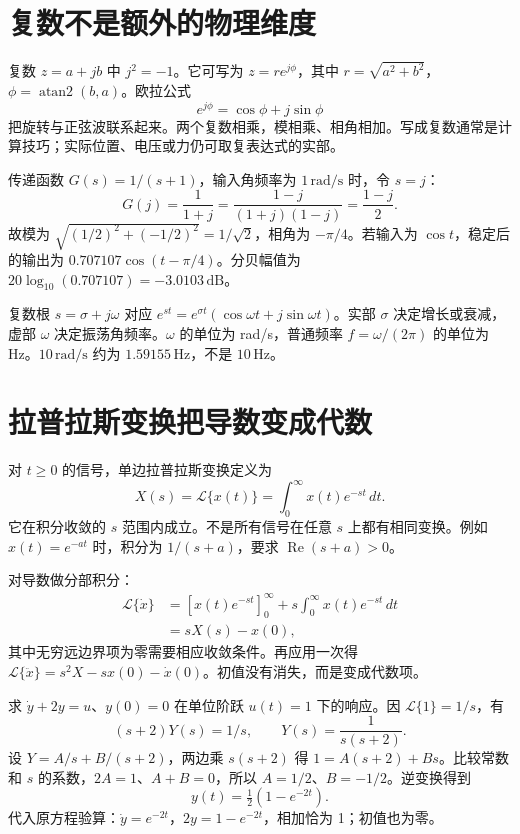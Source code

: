\section{复数不是额外的物理维度}
复数 $z=a+jb$ 中 $j^2=-1$。它可写为 $z=re^{j\phi}$，其中 $r=\sqrt{a^2+b^2}$，$\phi=\operatorname{atan2}(b,a)$。欧拉公式
\begin{equation}
 e^{j\phi}=\cos\phi+j\sin\phi
\end{equation}
把旋转与正弦波联系起来。两个复数相乘，模相乘、相角相加。写成复数通常是计算技巧；实际位置、电压或力仍可取复表达式的实部。

\begin{examplebox}[算例 一阶低通的幅值衰减和相位]
传递函数 $G(s)=1/(s+1)$，输入角频率为 $1\,\mathrm{rad/s}$ 时，令 $s=j$：
\[
 G(j)=\frac1{1+j}=\frac{1-j}{(1+j)(1-j)}=\frac{1-j}{2}.
\]
故模为 $\sqrt{(1/2)^2+(-1/2)^2}=1/\sqrt2$，相角为 $-\pi/4$。若输入为 $\cos t$，稳定后的输出为 $0.707107\cos(t-\pi/4)$。分贝幅值为 $20\log_{10}(0.707107)=-3.0103\,\mathrm{dB}$。
\end{examplebox}

复数根 $s=\sigma+j\omega$ 对应 $e^{st}=e^{\sigma t}(\cos\omega t+j\sin\omega t)$。实部 $\sigma$ 决定增长或衰减，虚部 $\omega$ 决定振荡角频率。$\omega$ 的单位为 rad/s，普通频率 $f=\omega/(2\pi)$ 的单位为 Hz。$10\,\mathrm{rad/s}$ 约为 $1.59155\,\mathrm{Hz}$，不是 $10\,\mathrm{Hz}$。

\section{拉普拉斯变换把导数变成代数}
对 $t\ge0$ 的信号，单边拉普拉斯变换定义为
\begin{equation}
 X(s)=\mathcal L\{x(t)\}=\int_0^\infty x(t)e^{-st}\,dt.
\end{equation}
它在积分收敛的 $s$ 范围内成立。不是所有信号在任意 $s$ 上都有相同变换。例如 $x(t)=e^{-at}$ 时，积分为 $1/(s+a)$，要求 $\operatorname{Re}(s+a)>0$。

对导数做分部积分：
\begin{align}
 \mathcal L\{\dot x\}
 &=\left[x(t)e^{-st}\right]_0^\infty
   +s\int_0^\infty x(t)e^{-st}\,dt\\
 &=sX(s)-x(0),
\end{align}
其中无穷远边界项为零需要相应收敛条件。再应用一次得 $\mathcal L\{\ddot x\}=s^2X-sx(0)-\dot x(0)$。初值没有消失，而是变成代数项。

\begin{examplebox}[算例 用拉普拉斯逐步解一个微分方程]
求 $\dot y+2y=u$、$y(0)=0$ 在单位阶跃 $u(t)=1$ 下的响应。因 $\mathcal L\{1\}=1/s$，有
\[
 (s+2)Y(s)=1/s,\qquad
 Y(s)=\frac1{s(s+2)}.
\]
设 $Y=A/s+B/(s+2)$，两边乘 $s(s+2)$ 得 $1=A(s+2)+Bs$。比较常数和 $s$ 的系数，$2A=1$、$A+B=0$，所以 $A=1/2$、$B=-1/2$。逆变换得到
\[
 y(t)=\tfrac12(1-e^{-2t}).
\]
代入原方程验算：$\dot y=e^{-2t}$，$2y=1-e^{-2t}$，相加恰为 1；初值也为零。
\end{examplebox}

